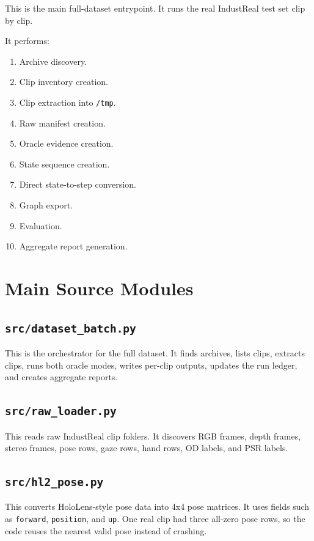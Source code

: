 \documentclass[11pt,a4paper]{article}
\begin{document}
This is the main full-dataset entrypoint. It runs the real IndustReal test set clip by clip.

It performs:

\begin{enumerate}[leftmargin=*]
    \item Archive discovery.
    \item Clip inventory creation.
    \item Clip extraction into \texttt{/tmp}.
    \item Raw manifest creation.
    \item Oracle evidence creation.
    \item State sequence creation.
    \item Direct state-to-step conversion.
    \item Graph export.
    \item Evaluation.
    \item Aggregate report generation.
\end{enumerate}

\section{Main Source Modules}

\subsection{\texttt{src/dataset\_batch.py}}

This is the orchestrator for the full dataset. It finds archives, lists clips, extracts clips, runs both oracle modes, writes per-clip outputs, updates the run ledger, and creates aggregate reports.

\subsection{\texttt{src/raw\_loader.py}}

This reads raw IndustReal clip folders. It discovers RGB frames, depth frames, stereo frames, pose rows, gaze rows, hand rows, OD labels, and PSR labels.

\subsection{\texttt{src/hl2\_pose.py}}

This converts HoloLens-style pose data into 4x4 pose matrices. It uses fields such as \texttt{forward}, \texttt{position}, and \texttt{up}. One real clip had three all-zero pose rows, so the code reuses the nearest valid pose instead of crashing.
\end{document}
